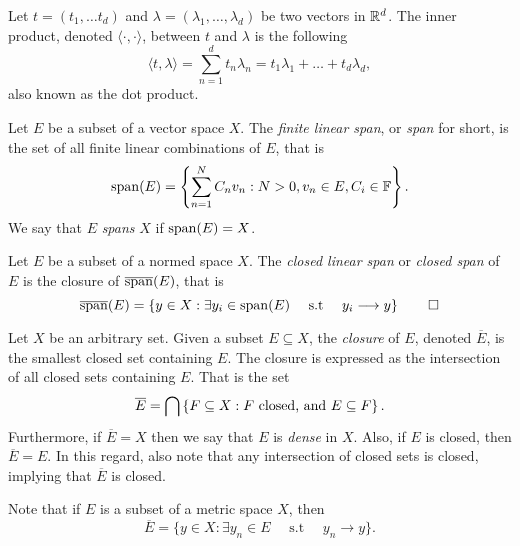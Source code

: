 \documentclass[../thesis.tex]{subfiles}
\begin{document}
\begin{definition}\label{def:dot_prod}
    Let $t=(t_1,\dots t_d)$ and $\lambda=(\lambda_1, \dots, \lambda_d)$ be two vectors in $\mathbb{R}^d$. The inner product, denoted $\langle \cdot, \cdot \rangle$, between $t$ and $\lambda$ is the following 
    \begin{equation*}
        \langle t, \lambda \rangle = \sum_{n=1}^d t_n \lambda_n = t_1\lambda_1 + \dots + t_d\lambda_d,
    \end{equation*}
    also known as the dot product. 
\end{definition}


\begin{definition}[Span]\label{def:span}
    Let $E$ be a subset of a vector space $X$. The \emph{finite linear span}, or \emph{span} for short, is the set of all finite linear combinations of $E$, that is
    \begin{equation*}
        \operatorname{span}(E)=\left\{\sum_{n=1}^N C_n v_n : N>0, v_n \in E, C_i \in \mathbb{F}\right\}.
    \end{equation*}
    We say that $E$ \emph{spans} $X$ if $\operatorname{span}(E) = X$.
\end{definition}


\begin{definition}\label{def:closed_span}
    Let $E$ be a subset of a normed space $X$. The \emph{closed linear span} or \emph{closed span} of $E$ is the closure of $\overline{\operatorname{span}}(E)$, that is
    \begin{equation*}
        \overline{\operatorname{span}}(E) = \left\{y\in X: \exists y_i\in \operatorname{span}(E) \quad \text{ s.t } \quad y_i \longrightarrow y\right\} \qedhere
    \end{equation*}
\end{definition}


\begin{definition}[Closure]\label{def:closure}
    Let $X$ be an arbitrary set. Given a subset $E \subseteq X$, the \emph{closure} of $E$, denoted $\overline{E}$, is the smallest closed set containing $E$. The closure is expressed as the intersection of all closed sets containing $E$. That is the set
    \begin{equation*}
        \overline{E} = \bigcap \left\{F \subseteq X : F \text{ closed, and } E \subseteq F\right\}.
    \end{equation*}
    Furthermore, if $\overline{E} = X$ then we say that $E$ is \emph{dense} in $X$. Also, if $E$ is closed, then $\overline{E}=E$. In this regard, also note that any intersection of closed sets is closed, implying that $\overline{E}$ is closed.
\end{definition}
\begin{remark}
    Note that if $E$ is a subset of a metric space $X$, then
    \begin{equation*}
        \overline{E} = \{ y \in X : \exists y_n\in E \quad \text{ s.t }\quad y_n \longrightarrow y\}.
    \end{equation*}
\end{remark}
\end{document}
